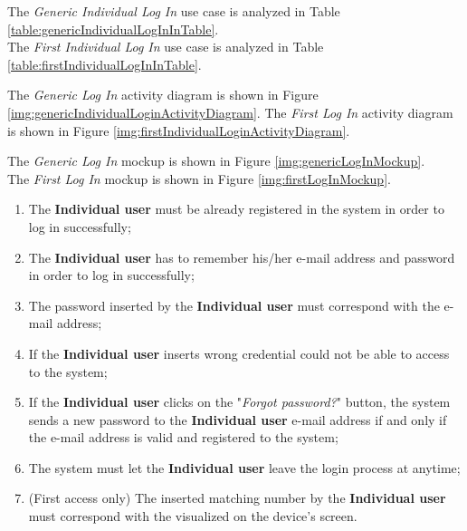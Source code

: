 The \textit{Generic Individual Log In} use case is analyzed in Table \ref{table:genericIndividualLogInInTable}.\\
The \textit{First Individual Log In} use case is analyzed in Table \ref{table:firstIndividualLogInInTable}.

The \textit{Generic Log In} activity diagram is shown in Figure \ref{img:genericIndividualLoginActivityDiagram}.
The \textit{First Log In} activity diagram is shown in Figure \ref{img:firstIndividualLoginActivityDiagram}.

The \textit{Generic Log In} mockup is shown in Figure \ref{img:genericLogInMockup}. \\
The \textit{First Log In} mockup is shown in Figure \ref{img:firstLogInMockup}.

\begin{enumerate}
  \item The \textbf{Individual user} must be already registered in the system in order to log in successfully;
  \item The \textbf{Individual user} has to remember his/her e-mail address and password in order to log in successfully;
  \item The password inserted by the \textbf{Individual user} must correspond with the e-mail address;
  \item If the \textbf{Individual user} inserts wrong credential could not be able to access to the system;
  \item If the \textbf{Individual user} clicks on the "\textit{Forgot password?}" button, the system sends a new password to the \textbf{Individual user} e-mail address if and only if the e-mail address is valid and registered to the system;
  \item The system must let the \textbf{Individual user} leave the login process at anytime;
  \item (First access only) The inserted matching number by the \textbf{Individual user} must correspond with the visualized on the device's screen.
\end{enumerate}

